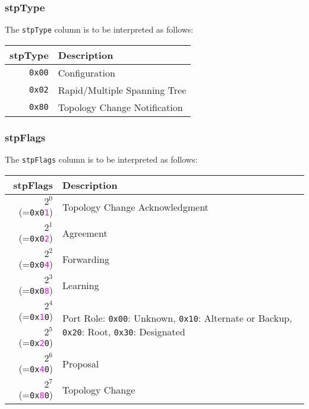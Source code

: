 \documentclass[documentation]{subfiles}
\begin{document}
\clearpage
\subsubsection{stpType}\label{stpType}
The {\tt stpType} column is to be interpreted as follows:
\begin{longtable}{rl}
    \toprule
    {\bf stpType} & {\bf Description}\\
    \midrule\endhead%
    {\tt 0x00} & Configuration\\
    {\tt 0x02} & Rapid/Multiple Spanning Tree\\
    {\tt 0x80} & Topology Change Notification\\
    \bottomrule
\end{longtable}

\subsubsection{stpFlags}\label{stpFlags}
The {\tt stpFlags} column is to be interpreted as follows:
\begin{longtable}{rl}
    \toprule
    {\bf stpFlags} & {\bf Description}\\
    \midrule\endhead%
    $2^0$ (={\tt 0x0\textcolor{magenta}{1}}) & Topology Change Acknowledgment\\
    $2^1$ (={\tt 0x0\textcolor{magenta}{2}}) & Agreement\\
    $2^2$ (={\tt 0x0\textcolor{magenta}{4}}) & Forwarding\\
    $2^3$ (={\tt 0x0\textcolor{magenta}{8}}) & Learning\\
    $2^4$ (={\tt 0x\textcolor{magenta}{1}0}) & \multirow{2}{*}{Port Role: {\tt 0x00}: Unknown, {\tt 0x10}: Alternate or Backup, {\tt 0x20}: Root, {\tt 0x30}: Designated}\\
    $2^5$ (={\tt 0x\textcolor{magenta}{2}0}) & \\
    $2^6$ (={\tt 0x\textcolor{magenta}{4}0}) & Proposal\\
    $2^7$ (={\tt 0x\textcolor{magenta}{8}0}) & Topology Change\\
    \bottomrule
\end{longtable}
\end{document}
